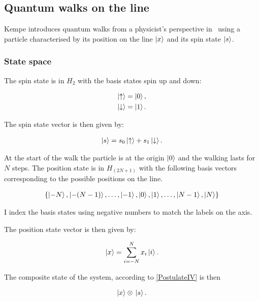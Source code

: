 \subsection{Quantum walks on the line}

Kempe introduces quantum walks from a physicist's perspective in~\cite{KempeIntroduction} using a particle characterised by its position on the line $\ket{x}$ and its spin state $\ket{s}$.

\subsubsection{State space}


The spin state is in $H_2$ with the basis states spin up and down:

\begin{align*}
\ket{\uparrow} = \ket{0}, \\
\ket{\downarrow} = \ket{1}.
\end{align*}

The spin state vector is then given by:

\begin{align*}
\ket{s} = s_0 \ket{\uparrow} + s_1 \ket{\downarrow}.
\end{align*}


At the start of the walk the particle is at the origin $\ket{0}$ and the walking lasts for $N$ steps. The position state is in $H_{(2N+1)}$ with the following basis vectors corresponding to the possible positions on the line.

\begin{align*}
\{
\ket{-N},\ket{-(N-1)},\dots,
\ket{-1},\ket{0},\ket{1},\dots,
\ket{N-1},\ket{N}
\}
\end{align*}

I index the basis states using negative numbers to match the labels on the axis.

The position state vector is then given by:

\begin{align*}
    \ket{x} = \sum\limits_{i=-N}^{N}x_i\ket{i}.
\end{align*}


The composite state of the system, according to \hyperref[PostulateIV]{[PostulateIV]} is then

\begin{align*}
    \ket{x}\otimes{}\ket{s}.
\end{align*}

